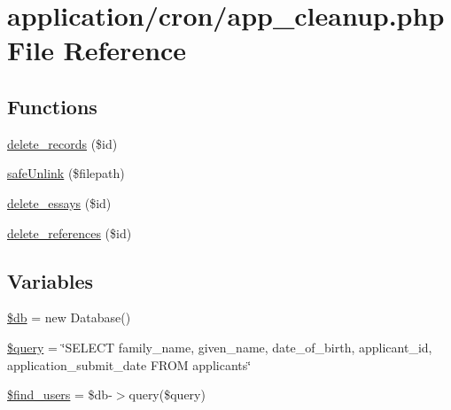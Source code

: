 \hypertarget{app__cleanup_8php}{\section{application/cron/app\-\_\-cleanup.php File Reference}
\label{app__cleanup_8php}
}
\subsection*{Functions}
\begin{DoxyCompactItemize}
\item 
\hyperlink{app__cleanup_8php_ae63e2cbd6c0768081a3fb915e24203cc}{delete\-\_\-records} (\$id)
\item 
\hyperlink{app__cleanup_8php_a25cc43e18a91d2382622ebdb8212e384}{safe\-Unlink} (\$filepath)
\item 
\hyperlink{app__cleanup_8php_a95c6eb758b90b078da7d469c1abe170e}{delete\-\_\-essays} (\$id)
\item 
\hyperlink{app__cleanup_8php_a8fc105438d39bc3bbf3c0fc9e2b66691}{delete\-\_\-references} (\$id)
\end{DoxyCompactItemize}
\subsection*{Variables}
\begin{DoxyCompactItemize}
\item 
\hyperlink{app__cleanup_8php_a1fa3127fc82f96b1436d871ef02be319}{\$db} = new Database()
\item 
\hyperlink{app__cleanup_8php_af59a5f7cd609e592c41dc3643efd3c98}{\$query} = \char`\"{}S\-E\-L\-E\-C\-T family\-\_\-name, given\-\_\-name, date\-\_\-of\-\_\-birth, applicant\-\_\-id, application\-\_\-submit\-\_\-date F\-R\-O\-M applicants\char`\"{}
\item 
\hyperlink{app__cleanup_8php_a09bc8ccbc60307ba2d4bfe5af5d2b9e5}{\$find\-\_\-users} = \$db-\/$>$query(\$query)
\end{DoxyCompactItemize}



